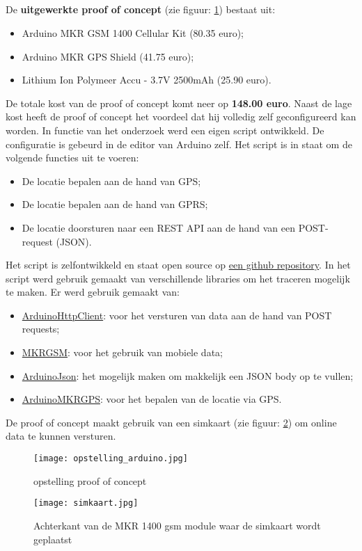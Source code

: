 \subsection{}
De \textbf{uitgewerkte proof of concept} (zie figuur: \ref{fig:opstelling_arduino}) bestaat uit:
\begin{itemize}
	\item Arduino MKR GSM 1400 Cellular Kit (80.35 euro);
	\item Arduino MKR GPS Shield (41.75 euro);
	\item Lithium Ion Polymeer Accu - 3.7V 2500mAh (25.90 euro).
\end{itemize}
De totale kost van de proof of concept komt neer op \textbf{148.00 euro}. Naast de lage kost heeft de proof of concept het voordeel dat hij volledig zelf geconfigureerd kan worden. In functie van het onderzoek werd een eigen script ontwikkeld. De configuratie is gebeurd in de editor van Arduino zelf. Het script is in staat om de volgende functies uit te voeren:
\begin{itemize}
	\item De locatie bepalen aan de hand van GPS;
	\item De locatie bepalen aan de hand van GPRS;
	\item De locatie doorsturen naar een REST API aan de hand van een POST-request (JSON).
\end{itemize}
Het script is zelfontwikkeld en staat open source op \underline{\href{https://github.com/IndyVC/bap-arduino}{een github repository}}. In het script werd gebruik gemaakt van verschillende libraries om het traceren mogelijk te maken.
Er werd gebruik gemaakt van:
\begin{itemize}
	\item \href{https://github.com/arduino-libraries/ArduinoHttpClient}{ArduinoHttpClient}: voor het versturen van data aan de hand van POST requests;
	\item \href{https://github.com/arduino-libraries/MKRGSM}{MKRGSM}: voor het gebruik van mobiele data;
	\item \href{https://github.com/bblanchon/ArduinoJson}{ArduinoJson}: het mogelijk maken om makkelijk een JSON body op te vullen;
	\item \href{https://github.com/arduino-libraries/Arduino_MKRGPS}{ArduinoMKRGPS}: voor het bepalen van de locatie via GPS.
\end{itemize}
De proof of concept maakt gebruik van een simkaart (zie figuur: \ref{fig:simkaart}) om online data te kunnen versturen. 
\begin{figure}
	\texttt{[image: opstelling\_arduino.jpg]}
	\caption{opstelling proof of concept}
	\label{fig:opstelling_arduino}
\end{figure}
\begin{figure}
	\texttt{[image: simkaart.jpg]}
	\caption[Achterkant MKR 1400 gsm module]{Achterkant van de MKR 1400 gsm module waar de simkaart wordt geplaatst}
	\label{fig:simkaart}
\end{figure}
\pagebreak
